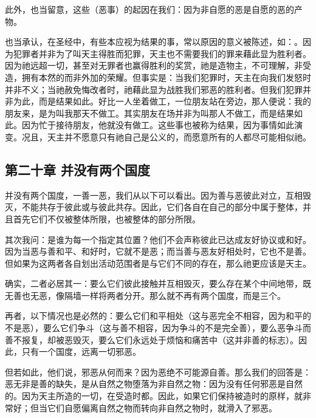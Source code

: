 此外，也当留意，这些（恶事）的起因在我们：因为非自愿的恶是自愿的恶的产物。\par

也当承认，在圣经中，有些本应视为结果的事，常以原因的意义被陈述，如：。因为犯罪者并非为了叫天主得胜而犯罪，天主也不需要我们的罪来藉此显为胜利者。因为祂远超一切，甚至对无罪者也赢得胜利的奖赏，祂是造物主，不可理解，非受造，拥有本然的而非外加的荣耀。但事实是：当我们犯罪时，天主在向我们发怒时并非不义；当祂赦免悔改者时，祂藉此显为战胜我们邪恶的胜利者。但我们犯罪并非为此，而是结果如此。好比一人坐着做工，一位朋友站在旁边，那人便说：我的朋友来，是为叫我那天不做工。其实朋友在场并非为叫那人不做工，而是结果如此。因为忙于接待朋友，他就没有做工。这些事也被称为结果，因为事情如此演变。况且，天主并不愿意只有祂自己是公义的，而愿意所有的人都尽可能相似祂。\par


\subsection{第二十章 并没有两个国度}

并没有两个国度，一善一恶，我们从以下可以看出。因为善与恶彼此对立，互相毁灭，不能共存于彼此或与彼此共存。因此，它们各自在自己的部分中属于整体，并且首先它们不仅被整体所限，也被整体的部分所限。\par

其次我问：是谁为每一个指定其位置？他们不会声称彼此已达成友好协议或和好。因为当恶与善和平、和好时，它就不是恶；而当善与恶友好相处时，它也不是善。但如果为这两者各自划出活动范围者是与它们不同的存在，那么祂更应该是天主。\par

确实，二者必居其一：要么它们彼此接触并互相毁灭，要么存在某个中间地带，既无善也无恶，像隔墙一样将两者分开。那么就不再有两个国度，而是三个。\par

再者，以下情况也是必然的：要么它们和平相处（这与恶完全不相容，因为和平的不是恶），要么它们争斗（这与善不相容，因为争斗的不是完全善），要么恶争斗而善不报复，却被恶毁灭，要么它们永远处于烦恼和痛苦中（这并非善的标志）。因此，只有一个国度，远离一切邪恶。\par

但若如此，他们说，邪恶从何而来？因为恶绝不可能源自善。那么我们的回答是：恶无非是善的缺失，是从自然之物堕落为非自然之物：因为没有任何邪恶是自然的。因为天主所造的一切，在受造时都。因此，如果它们保持被造时的原样，就非常好；但当它们自愿偏离自然之物而转向非自然之物时，就滑入了邪恶。\par

